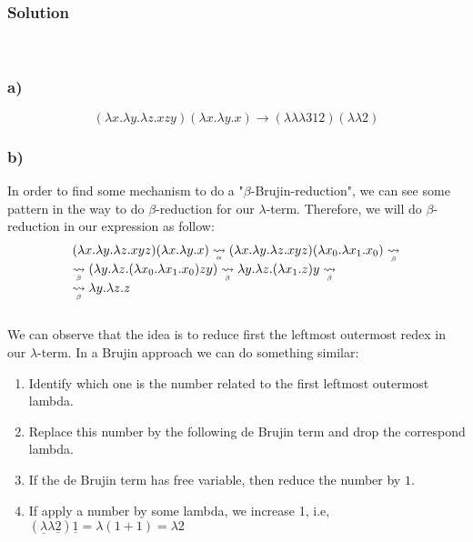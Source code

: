 \documentclass{article}
\newcommand\stcarrow[2]{%
    \mathrel{\stackunder[2pt]{\stackon[4pt]{$\rightsquigarrow$}{$\scriptscriptstyle#1$}}{%
            $\scriptscriptstyle#2$}}}
\newcommand{\ar}[1]{\stcarrow{}{\alpha}#1}
\newcommand{\br}[1]{\stcarrow{}{\beta}#1}
\newcommand{\lm}[1]{\lambda #1 .}
\begin{document}
\subsubsection*{Solution} \\
\subsubsection*{a)}
$$(\lm{x}\lm{y}\lm{z} x z y)(\lm{x}\lm{y} x) \longrightarrow (\lambda \lambda \lambda 312)(\lambda \lambda 2)$$
\subsubsection*{b)}
In order to find some mechanism to do a "$\beta$-Brujin-reduction", we can see some pattern in the way to do $\beta$-reduction for our $\lambda$-term. Therefore, we will do $\beta$-reduction in our expression as follow:\\
\begin{equation*}
\begin{array}{l}
      (\lm{x}\lm{y}\lm{z} x y z)(\lm{x}\lm{y}x) \ar{(\lm{x}\lm{y}\lm{z} x y z)(\lm{x_0}\lm{x_1}x_0)} \br{} \\
      \br{(\lm{y}\lm{z}(\lm{x_0}\lm{x_1}x_0)zy)} \br{\lm{y}\lm{z}(\lm{x_1}z)y} \br{} \\
      \br{\lm{y}\lm{z}z}
\end{array}
\end{equation*}\\
We can observe that the idea is to reduce first the leftmost outermost redex in our $\lambda$-term. In a Brujin approach we can do something similar:
\begin{enumerate}
    \item Identify which one is the number related to the first leftmost outermost lambda.
    \item Replace this number by the following de Brujin term and drop the correspond lambda.
    \item If the de Brujin term has free variable, then reduce the number by $1$.
    \item If apply a number by some lambda, we increase 1, i.e, $(\underline{\lambda} \lambda \underline{2})\underline{1} = \lambda (1 +1) = \lambda 2$

\end{enumerate}
\end{document}
